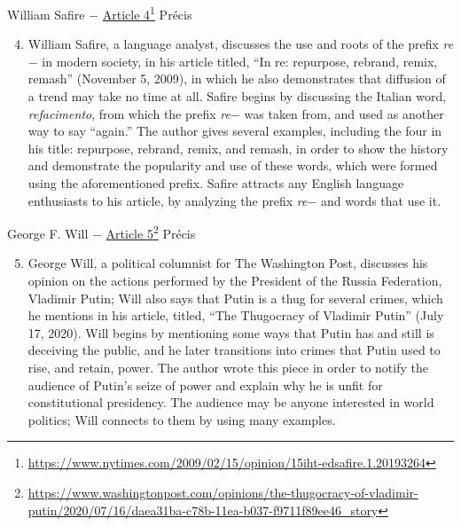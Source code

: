 \documentclass[12pt]{article}
\begin{document}
\begin{center}
William Safire $-$ \href{https://www.nytimes.com/2009/02/15/opinion/15iht-edsafire.1.20193264}{Article 4}\footnote{\url{https://www.nytimes.com/2009/02/15/opinion/15iht-edsafire.1.20193264}} Pr\'ecis
\end{center}
\begin{justify}
\begin{enumerate}
    \setcounter{enumi}{3}

  \item William Safire, a language analyst, discusses the use and roots of the prefix \textit{re}$-$ in modern society, in his article titled, ``In re: repurpose, rebrand, remix, remash'' (November 5, 2009), in which he also demonstrates that diffusion of a trend may take no time at all. Safire begins by discussing the Italian word, \textit{refacimento}, from which the prefix \textit{re}$-$ was taken from, and used as another way to say ``again.'' The author gives several examples, including the four in his title: repurpose, rebrand, remix, and remash, in order to show the history and demonstrate the popularity and use of these words, which were formed using the aforementioned prefix. Safire attracts any English language enthusiasts to his article, by analyzing the prefix \textit{re}$-$ and words that use it.

\end{enumerate}
\end{justify}
\newpage

\begin{center}
George F. Will $-$ \href{https://www.washingtonpost.com/opinions/the-thugocracy-of-vladimir-putin/2020/07/16/daea31ba-c78b-11ea-b037-f9711f89ee46_story}{Article 5}\footnote{\url{https://www.washingtonpost.com/opinions/the-thugocracy-of-vladimir-putin/2020/07/16/daea31ba-c78b-11ea-b037-f9711f89ee46_story}} Pr\'ecis
\end{center}
\begin{justify}
\begin{enumerate}
    \setcounter{enumi}{4}

  \item George Will, a political columnist for The Washington Post, discusses his opinion on the actions performed by the President of the Russia Federation, Vladimir Putin; Will also says that Putin is a thug for several crimes, which he mentions in his article, titled, ``The Thugocracy of Vladimir Putin'' (July 17, 2020). Will begins by mentioning some ways that Putin has and still is deceiving the public, and he later transitions into crimes that Putin used to rise, and retain, power. The author wrote this piece in order to notify the audience of Putin's seize of power and explain why he is unfit for constitutional presidency. The audience may be anyone interested in world politics; Will connects to them by using many examples. 

\end{enumerate}
\end{justify}
\newpage
\end{document}
